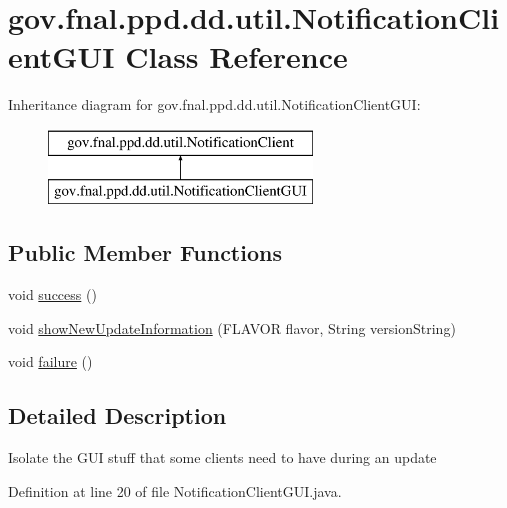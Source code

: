 \hypertarget{classgov_1_1fnal_1_1ppd_1_1dd_1_1util_1_1NotificationClientGUI}{\section{gov.\-fnal.\-ppd.\-dd.\-util.\-Notification\-Client\-G\-U\-I Class Reference}
\label{classgov_1_1fnal_1_1ppd_1_1dd_1_1util_1_1NotificationClientGUI}
}
Inheritance diagram for gov.\-fnal.\-ppd.\-dd.\-util.\-Notification\-Client\-G\-U\-I\-:\begin{figure}[H]
\begin{center}
\leavevmode
\includegraphics[height=2.000000cm]{classgov_1_1fnal_1_1ppd_1_1dd_1_1util_1_1NotificationClientGUI}
\end{center}
\end{figure}
\subsection*{Public Member Functions}
\begin{DoxyCompactItemize}
\item 
void \hyperlink{classgov_1_1fnal_1_1ppd_1_1dd_1_1util_1_1NotificationClientGUI_a114fad00decbffa337cd0372ee451169}{success} ()
\item 
void \hyperlink{classgov_1_1fnal_1_1ppd_1_1dd_1_1util_1_1NotificationClientGUI_a37ef05c2a1ea25b71fcac14cc433013e}{show\-New\-Update\-Information} (F\-L\-A\-V\-O\-R flavor, String version\-String)
\item 
void \hyperlink{classgov_1_1fnal_1_1ppd_1_1dd_1_1util_1_1NotificationClientGUI_ae82c57fd5a6d3344212edac93f9c0170}{failure} ()
\end{DoxyCompactItemize}


\subsection{Detailed Description}
Isolate the G\-U\-I stuff that some clients need to have during an update 

Definition at line 20 of file Notification\-Client\-G\-U\-I.\-java.



